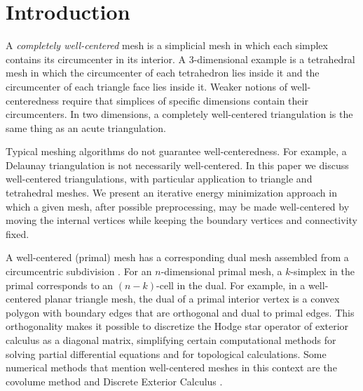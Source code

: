 \documentclass[final]{siamltex}
\begin{document}
\section{Introduction}

A \emph{completely well-centered} mesh is a simplicial mesh in which
each simplex contains its circumcenter in its interior. A
3-dimensional example is a tetrahedral mesh in which the circumcenter
of each tetrahedron lies inside it and the circumcenter of each
triangle face lies inside it. Weaker notions of well-centeredness
  require that simplices of specific dimensions contain their
  circumcenters. In two dimensions, a completely well-centered
triangulation is the same thing as an acute triangulation.

Typical meshing algorithms do not guarantee well-centeredness. For
example, a Delaunay triangulation is not necessarily well-centered. In
this paper we discuss well-centered triangulations, with particular
application to triangle and tetrahedral meshes.  We present an
iterative energy minimization approach in which a given mesh, after
possible preprocessing, may be made well-centered by moving the
internal vertices while keeping the boundary vertices and connectivity
fixed.

A well-centered (primal) mesh has a corresponding dual mesh assembled
from a circumcentric subdivision \cite{Hirani2003}. For an
$n$-dimensional primal mesh, a $k$-simplex in the primal corresponds
to an $(n-k)$-cell in the dual. For example, in a well-centered planar
triangle mesh, the dual of a primal interior vertex is a convex
polygon with boundary edges that are orthogonal and dual to primal
edges. This orthogonality makes it possible to discretize the Hodge
star operator of exterior calculus \cite{AbMaRa1988} as a diagonal
matrix, simplifying certain computational methods for solving partial
differential equations and for topological calculations. Some
numerical methods that mention well-centered meshes in this context
are the covolume method \cite{Nicolaides1992} and Discrete Exterior
Calculus \cite{Hirani2003,DeHiLeMa2005}.
\end{document}

